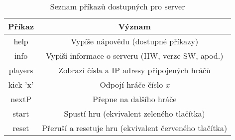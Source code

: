 \begin{table}[hbtp]
  \centering
\caption{\label{tab:server_prikazy} Seznam příkazů dostupných pro server}
\begin{tabular}{|c|c|}
\hline
\textbf{Příkaz} & \textbf{Význam}                                        \\ \hline
help            & Vypíše nápovědu (dostupné příkazy)                     \\ \hline
info            & Vypiší informace o serveru (HW, verze SW, apod.)       \\ \hline
players         & Zobrazí čísla a IP adresy připojených hráčů            \\ \hline
kick 'x'        & Odpojí hráče číslo \textit{x}                          \\ \hline
nextP           & Přepne na dalšího hráče                                \\ \hline
start           & Spustí hru (ekvivalent zeleného tlačítka)              \\ \hline
reset           & Přeruší a resetuje hru (ekvivalent červeného tlačítka) \\ \hline
\end{tabular}
\end{table}
